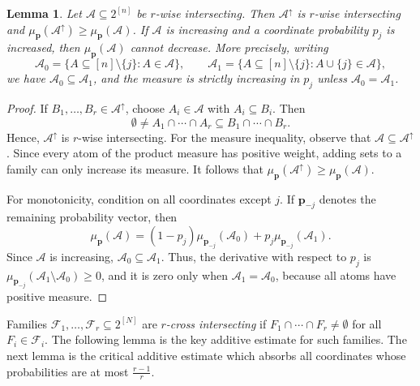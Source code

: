 \documentclass[11pt]{article}
\newtheorem{lemma}[theorem]{Lemma}
\begin{document}
\begin{lemma}\label{lem:monotone}
Let $\mathcal{A}\subseteq2^{[n]}$ be $r$-wise intersecting.
Then $\mathcal{A}^\uparrow$ is $r$-wise intersecting and
$\mu_{\mathbf p}(\mathcal{A}^\uparrow)\ge\mu_{\mathbf p}(\mathcal{A})$.
If $\mathcal{A}$ is increasing and a coordinate probability $p_j$ is increased, then
$\mu_{\mathbf p}(\mathcal{A})$ cannot decrease.  More precisely, writing
\[
 \mathcal{A}_0=\{A\subseteq[n]\setminus\{j\}:A\in\mathcal{A}\},\qquad
 \mathcal{A}_1=\{A\subseteq[n]\setminus\{j\}:A\cup\{j\}\in\mathcal{A}\},
\]
we have $\mathcal{A}_0\subseteq\mathcal{A}_1$, and the measure is strictly increasing in
$p_j$ unless $\mathcal{A}_0=\mathcal{A}_1$.
\end{lemma}

\begin{proof}
If $B_1,\ldots,B_r\in\mathcal{A}^\uparrow$, choose $A_i\in\mathcal{A}$ with
$A_i\subseteq B_i$.  Then
$$
 \emptyset\ne A_1\cap\cdots\cap A_r\subseteq B_1\cap\cdots\cap B_r.
$$
Hence, $\mathcal{A}^\uparrow$ is $r$-wise intersecting.  For the measure inequality, observe that $\mathcal A\subseteq\mathcal A^{\uparrow}$. Since every atom of the product measure has positive weight, adding sets to a family can only increase its measure. It follows that $\mu_{\mathbf p}(\mathcal A^{\uparrow})\ge\mu_{\mathbf p}(\mathcal A)$.

For monotonicity, condition on all coordinates except $j$.  If
$\mathbf p_{-j}$ denotes the remaining probability vector, then
\[
 \mu_{\mathbf p}(\mathcal{A})=(1-p_j)\mu_{\mathbf p_{-j}}(\mathcal{A}_0)
        +p_j\mu_{\mathbf p_{-j}}(\mathcal{A}_1).
\]
Since $\mathcal{A}$ is increasing, $\mathcal{A}_0\subseteq\mathcal{A}_1$.  Thus, the derivative
with respect to $p_j$ is
$\mu_{\mathbf p_{-j}}(\mathcal{A}_1\setminus\mathcal{A}_0)\ge0$, and it is zero only when
$\mathcal{A}_1=\mathcal{A}_0$, because all atoms have positive measure.
\end{proof}


Families $\mathcal F_1,\ldots,\mathcal F_r\subseteq 2^{[N]}$ are \textit{$r$-cross intersecting} if $F_1\cap\cdots\cap F_r\neq\emptyset$ for all $F_i\in\mathcal F_i$. The following lemma is the key additive estimate for such families.
The next lemma is the critical additive estimate which absorbs all coordinates
whose probabilities are at most $\frac{r-1}{r}$.
\end{document}
